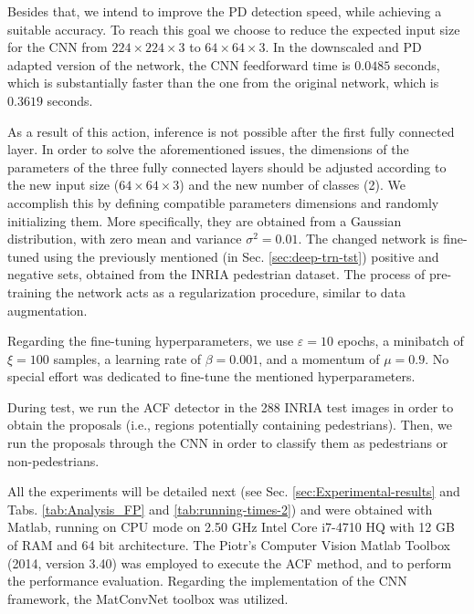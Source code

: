 \documentclass[5p,time]{elsarticle}
\begin{document}
Besides that, we intend to improve the PD detection speed, while achieving a suitable accuracy. To reach this goal we choose to reduce the expected input size for the CNN from $224 \times 224 \times 3$ to $64 \times 64 \times 3$. In the downscaled and PD adapted version of the network, the CNN feedforward time is $0.0485$ seconds, which is substantially faster than the one from the original network, which is $0.3619$ seconds.

As a result of this action, inference is not possible after the first fully connected layer. In order to solve the aforementioned issues, the dimensions of the parameters of the three fully connected layers should be adjusted according to the new input size ($64 \times 64 \times 3$) and the new number of classes (2). We accomplish this by defining compatible parameters dimensions and randomly initializing them. More specifically, they are obtained from a Gaussian distribution, with zero mean and variance $\sigma^2 =0.01$. The changed network is fine-tuned using the previously mentioned (in Sec. \ref{sec:deep-trn-tst}) positive and negative sets, obtained from the INRIA pedestrian dataset. The process of pre-training the network acts as a regularization procedure, similar to data augmentation.

Regarding the fine-tuning hyperparameters, we use $\varepsilon=10$
epochs, a minibatch of $\xi=100$ samples, a learning rate of $\beta=
0.001$, and a momentum of $\mu=0.9$. No special effort was dedicated
to fine-tune the mentioned hyperparameters.

During test, we run the ACF detector in the 288 INRIA test images in
order to obtain the proposals (i.e., regions potentially containing
pedestrians). Then, we run the proposals through the CNN in order to
classify them as pedestrians or non-pedestrians.

All the experiments will be detailed next (see Sec.
\ref{sec:Experimental-results} and Tabs. \ref{tab:Analysis_FP} and \ref{tab:running-times-2}) and were
obtained with Matlab, running on CPU mode on 2.50 GHz Intel Core
i7-4710 HQ with 12 GB of RAM and 64 bit architecture. The Piotr's
Computer Vision Matlab Toolbox \cite{DollarToolbox} (2014, version
3.40) was employed to execute the ACF method, and to perform the
performance evaluation. Regarding the implementation of the CNN
framework, the MatConvNet toolbox \cite{vedaldi15matconvnet} was
utilized.
\end{document}
